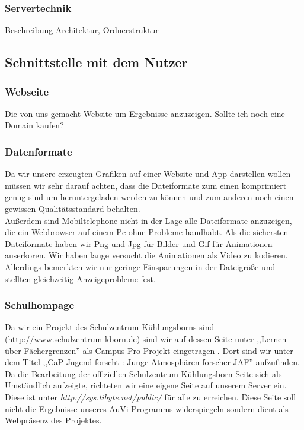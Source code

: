 \documentclass[a4paper,oneside,12pt,titlepage]{article}
\newcommand{\jf}{Jugend forscht }
\newcommand{\link}[1]{\textcolor{link}{\url{#1}}}	%
\begin{document}
\subsubsection{Servertechnik} %
Beschreibung Architektur, Ordnerstruktur

\subsection{Schnittstelle mit dem Nutzer} %

\subsubsection{Webseite} %
Die von uns gemacht Website um Ergebnisse anzuzeigen. Sollte ich noch eine Domain kaufen?

\subsubsection{Datenformate} %
Da wir unsere erzeugten Grafiken auf einer Website und App darstellen wollen müssen wir sehr darauf achten, dass die Dateiformate zum einen komprimiert genug sind um heruntergeladen werden zu können und zum anderen noch einen gewissen Qualitätsstandard behalten.\\
Außerdem sind Mobiltelephone nicht in der Lage alle Dateiformate anzuzeigen, die ein Webbrowser auf einem Pc ohne Probleme handhabt. Als die sichersten Dateiformate haben wir Png und Jpg für Bilder und Gif für Animationen auserkoren. Wir haben lange versucht die Animationen als Video zu kodieren. Allerdings bemerkten wir nur geringe Einsparungen in der Dateigröße und stellten gleichzeitig Anzeigeprobleme fest.

\subsubsection{Schulhompage} %
Da wir ein Projekt des Schulzentrum Kühlungsborns sind (\link{http://www.schulzentrum-kborn.de}) sind wir auf dessen Seite unter ,,Lernen über Fächergrenzen'' als Campus Pro Projekt eingetragen \cite{szkb}. Dort sind wir unter dem Titel ,,CaP \jf : Junge Atmosphären-forscher JAF'' aufzufinden. Da die Bearbeitung der offiziellen Schulzentrum Kühlungsborn Seite sich als Umständlich aufzeigte, richteten wir eine eigene Seite auf unserem Server ein. Diese ist unter \textit{http://sys.tibyte.net/public/}
für alle zu erreichen. Diese Seite soll nicht die Ergebnisse unseres AuVi Programms widerspiegeln sondern dient als Webpräsenz des Projektes.
\end{document}
